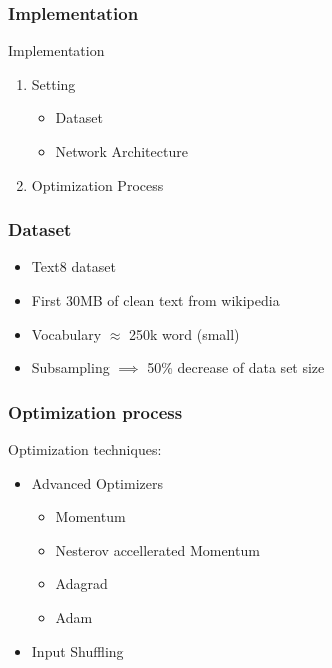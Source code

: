 \begin{frame}\frametitle{Implementation}
\begin{Large}
Implementation
\end{Large}
\begin{enumerate}
\item Setting
\begin{itemize}
\item Dataset 
\item Network Architecture 
\end{itemize}
\item Optimization Process
\end{enumerate}
\end{frame}
\iffalse
\begin{frame}
\frametitle{Hardware Specs} 
\begin{itemize}
\item Intel(R) Xeon(R) CPU E5- 2650 v3 @ 2.30GHz
\item CPU(s):                40
\end{itemize}
\end{frame}
\fi
\begin{frame}
\frametitle{Dataset} 
    \begin{itemize}
\item Text8 dataset
\item First 30MB of clean text from wikipedia 
\item Vocabulary $\approx$ 250k word (small) 
\item Subsampling $\implies$ 50\% decrease of data set size
\end{itemize}
\end{frame}

\begin{frame}
\frametitle{Optimization process}
Optimization techniques:
\begin{itemize}
\item Advanced Optimizers
\begin{itemize}
\item Momentum
\item Nesterov accellerated Momentum 
\item Adagrad 
\item Adam
\end{itemize}
\item Input Shuffling
\end{itemize}
\end{frame}
